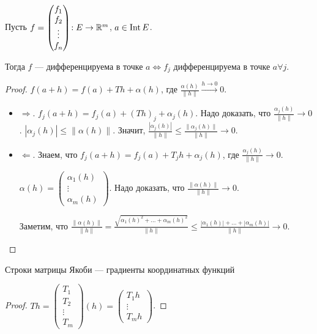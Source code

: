 \begin{theorem}
Пусть $f = \begin{pmatrix} f_1 \\ f_2 \\ \vdots \\ f_n \end{pmatrix}\!: E \to \mathbb{R}^m$, $a \in \operatorname{Int} E$.

Тогда $f$ --- дифференцируема в точке  $a \iff f_j$ дифференцируема в точке  $a \forall j$.
\end{theorem} 
\begin{proof}
    $f(a+h) = f(a) + Th + \alpha(h)$, где  $\frac{\alpha(h)}{\|h\|} \xrightarrow{h \to 0} 0$.
    \begin{itemize}
        \item $\Rightarrow$.  $f_j(a+h) = f_j(a) + (Th)_j + \alpha_j(h)$. Надо доказать, что  $\frac{\alpha_j(h)}{\|h\|} \to 0$. $|\alpha_j(h)| \le \|\alpha(h)\|$. Значит, $\frac{|\alpha_j(h)|}{\|h\|} \le \frac{\|\alpha_j(h)\|}{\|h\|} \to 0$.
        \item $\Leftarrow$. Знаем, что  $f_j(a+h) = f_j(a) + T_jh + \alpha_j(h)$, где  $\frac{\alpha_j(h)}{\|h\|} \to 0$. 

            $\alpha(h) = \begin{pmatrix} \alpha_1(h) \\ \vdots \\ \alpha_m(h) \end{pmatrix}$. Надо доказать, что $\frac{\|\alpha(h)\|}{\|h\|} \to 0$.

            Заметим, что $\frac{\|\alpha(h)\|}{\|h\|} = \frac{\sqrt{\alpha_1(h)^2 + \ldots + \alpha_m(h)^2}}{\|h\|} \le  \frac{|\alpha_1(h)| + \ldots + |\alpha_m(h)|}{\|h\|} \to 0$.
    \end{itemize}
\end{proof}
\begin{consequence}
    Строки матрицы Якоби --- градиенты координатных функций
\end{consequence}
\begin{proof}
    $Th = \begin{pmatrix} T_1 \\ T_2 \\ \vdots \\ T_m \end{pmatrix}(h) = \begin{pmatrix} T_1h \\ \vdots \\ T_mh \end{pmatrix}$.
\end{proof}
